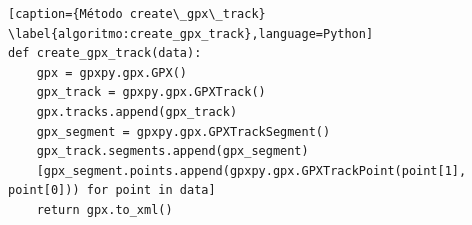 \begin{lstlisting}[caption={Método create\_gpx\_track}
\label{algoritmo:create_gpx_track},language=Python] 
def create_gpx_track(data):
    gpx = gpxpy.gpx.GPX()
    gpx_track = gpxpy.gpx.GPXTrack()
    gpx.tracks.append(gpx_track)
    gpx_segment = gpxpy.gpx.GPXTrackSegment()
    gpx_track.segments.append(gpx_segment)
    [gpx_segment.points.append(gpxpy.gpx.GPXTrackPoint(point[1], point[0])) for point in data]
    return gpx.to_xml()
\end{lstlisting}
